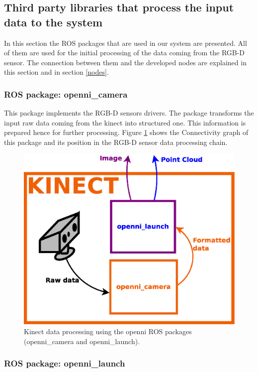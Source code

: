 \newpage
\subsection{Third party libraries that process the input data to the system}
\label{ros_packages}
In this section the ROS packages that are used in our system are presented. 
All of them are used for the initial processing of the data coming from the RGB-D sensor. 
The connection between them and the developed nodes are explained in this section and in section \ref{nodes}.

\subsubsection{ROS package: openni\_camera}
\label{openni_camera}

This package implements the RGB-D sensors drivers.
The package transforms the input raw data coming from the kinect into structured one. 
This information is prepared hence for further processing. 
Figure \ref{diagram_kinect_data} shows the Connectivity graph of this package and its position in the RGB-D sensor data processing chain. 
 
	\begin{figure}[H]
			\begin{center}
			\includegraphics[width=0.4\linewidth]{img/diagrams/kinect_data.eps}
			\caption[Kinect data processing]{Kinect data processing using the openni ROS packages (openni\_camera and openni\_launch).}
			\label{diagram_kinect_data}
			\end{center}
		\end{figure}

\subsubsection{ROS package: openni\_launch}
\label{openni_launch}

